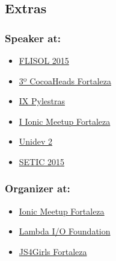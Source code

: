 \documentclass[]{article}
\providecommand{\tightlist}{%
  \setlength{\itemsep}{0pt}\setlength{\parskip}{0pt}}
\begin{document}
\subsection{Extras}\label{extras}

\subsubsection{Speaker at:}\label{speaker-at}

\begin{itemize}
\tightlist
\item
  \href{http://flisolce.org/}{FLISOL 2015}
\item
  \href{http://www.cocoaheads.com.br/agendas/detalhes/79/}{3º CocoaHeads
  Fortaleza}
\item
  \href{http://pylestras.org/evento/ix-pylestras/}{IX Pylestras}
\item
  \href{http://www.meetup.com/pt/Ionic-Ceara/events/224620543/}{I Ionic
  Meetup Fortaleza}
\item
  \href{http://unidevce.github.io/}{Unidev 2}
\item
  \href{http://www.seti.ufc.br/}{SETIC 2015}
\end{itemize}

\subsubsection{Organizer at:}\label{organizer-at}

\begin{itemize}
\tightlist
\item
  \href{http://ionicbrazil.com/}{Ionic Meetup Fortaleza}
\item
  \href{https://github.com/lambda-io}{Lambda I/O Foundation}
\item
  \href{http://js4girls-fortaleza.github.io/}{JS4Girls Fortaleza}
\end{itemize}
\end{document}
